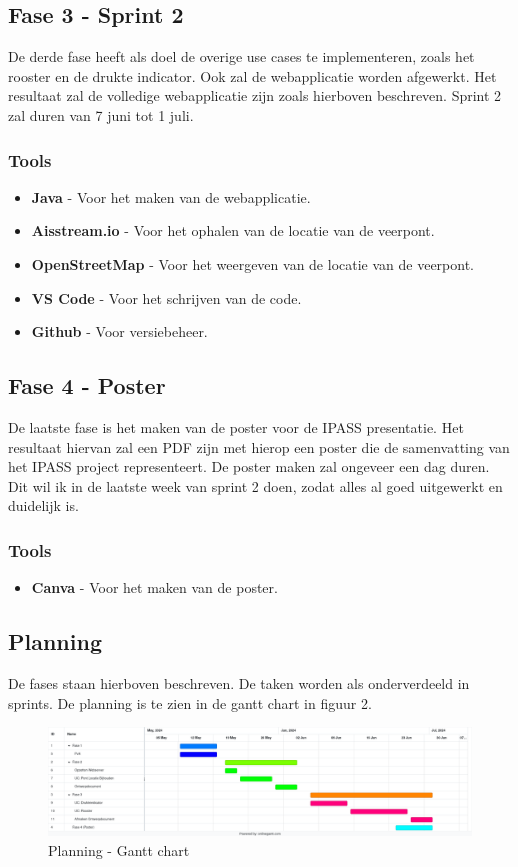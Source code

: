 \documentclass{article}
\begin{document}
\subsection{Fase 3 - Sprint 2}
De derde fase heeft als doel de overige use cases te implementeren, zoals het rooster en de drukte indicator. Ook zal de webapplicatie worden afgewerkt. 
Het resultaat zal de volledige webapplicatie zijn zoals hierboven beschreven. 
Sprint 2 zal duren van 7 juni tot 1 juli.
\subsubsection{Tools}
\begin{itemize}
    \item \textbf{Java} - Voor het maken van de webapplicatie.
    \item \textbf{Aisstream.io} - Voor het ophalen van de locatie van de veerpont.
    \item \textbf{OpenStreetMap} - Voor het weergeven van de locatie van de veerpont.
    \item \textbf{VS Code} - Voor het schrijven van de code.
    \item \textbf{Github} - Voor versiebeheer.
\end{itemize}

\subsection{Fase 4 - Poster}
De laatste fase is het maken van de poster voor de IPASS presentatie. Het resultaat hiervan zal een PDF zijn met hierop een poster die de samenvatting van het IPASS project representeert.
De poster maken zal ongeveer een dag duren. Dit wil ik in de laatste week van sprint 2 doen, zodat alles al goed uitgewerkt en duidelijk is.
\subsubsection{Tools}
\begin{itemize}
    \item \textbf{Canva} - Voor het maken van de poster.
\end{itemize}

\subsection{Planning}
De fases staan hierboven beschreven. De taken worden als onderverdeeld in sprints. De planning is te zien in de gantt chart in figuur 2.
\begin{figure}[h]
    \centering
    \label{fig:gc}
    \includegraphics[width=1\textwidth]{images/gantt.png}
    \caption{Planning - Gantt chart}
\end{figure}
\end{document}
